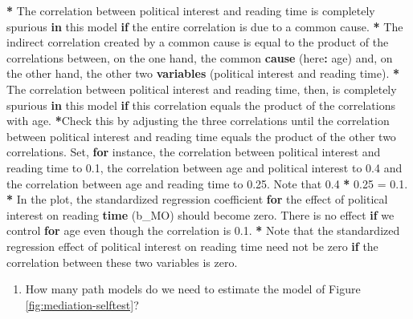 \documentclass[a4paper]{book}
\newenvironment{Shaded}{\begin{snugshade}}{\end{snugshade}}
\newcommand{\KeywordTok}[1]{\textcolor[rgb]{0,0,0}{\textbf{#1}}}
\newcommand{\FloatTok}[1]{\textcolor[rgb]{0.00,0.00,0.00}{#1}}
\newcommand{\StringTok}[1]{\textcolor[rgb]{0.00,0.00,0.00}{#1}}
\newcommand{\ControlFlowTok}[1]{\textcolor[rgb]{0.00,0.00,0.00}{\textbf{#1}}}
\newcommand{\OperatorTok}[1]{\textcolor[rgb]{0.00,0.00,0.00}{\textbf{#1}}}
\newcommand{\NormalTok}[1]{#1}
\providecommand{\tightlist}{%
  \setlength{\itemsep}{0pt}\setlength{\parskip}{0pt}}
\theoremstyle{definition}
\theoremstyle{definition}
\theoremstyle{definition}
\theoremstyle{remark}
\begin{document}
\begin{Shaded}
\begin{Highlighting}[]
\OperatorTok{*}\StringTok{ }\NormalTok{The correlation between political interest and reading time is completely}
\NormalTok{spurious }\ControlFlowTok{in}\NormalTok{ this model }\ControlFlowTok{if}\NormalTok{ the entire correlation is due to a common cause.}
\OperatorTok{*}\StringTok{ }\NormalTok{The indirect correlation created by a common cause is equal to the product}
\NormalTok{of the correlations between, on the one hand, the common }\KeywordTok{cause}\NormalTok{ (here}\OperatorTok{:}\StringTok{ }\NormalTok{age)}
\NormalTok{and, on the other hand, the other two }\KeywordTok{variables}\NormalTok{ (political interest and}
\NormalTok{reading time).}
\OperatorTok{*}\StringTok{ }\NormalTok{The correlation between political interest and reading time, then, is}
\NormalTok{completely spurious }\ControlFlowTok{in}\NormalTok{ this model }\ControlFlowTok{if}\NormalTok{ this correlation equals the product of}
\NormalTok{the correlations with age.}
\OperatorTok{*}\NormalTok{Check this by adjusting the three correlations until the correlation between}
\NormalTok{political interest and reading time equals the product of the other two}
\NormalTok{correlations. Set, }\ControlFlowTok{for}\NormalTok{ instance, the correlation between political interest and}
\NormalTok{reading time to }\FloatTok{0.1}\NormalTok{, the correlation between age and political interest to }\FloatTok{0.4}
\NormalTok{and the correlation between age and reading time to }\FloatTok{0.25}\NormalTok{. Note that }\FloatTok{0.4} \OperatorTok{*}\StringTok{ }\FloatTok{0.25}
\NormalTok{=}\StringTok{ }\FloatTok{0.1}\NormalTok{.}
\OperatorTok{*}\StringTok{ }\NormalTok{In the plot, the standardized regression coefficient }\ControlFlowTok{for}\NormalTok{ the effect of}
\NormalTok{political interest on reading }\KeywordTok{time}\NormalTok{ (b_MO) should become zero. There is no}
\NormalTok{effect }\ControlFlowTok{if}\NormalTok{ we control }\ControlFlowTok{for}\NormalTok{ age even though the correlation is }\FloatTok{0.1}\NormalTok{.}
\OperatorTok{*}\StringTok{ }\NormalTok{Note that the standardized regression effect of political interest on}
\NormalTok{reading time need not be zero }\ControlFlowTok{if}\NormalTok{ the correlation between these two variables}
\NormalTok{is zero.}
\end{Highlighting}
\end{Shaded}

\begin{enumerate}
\def\labelenumi{\arabic{enumi}.}
\setcounter{enumi}{3}
\tightlist
\item
  How many path models do we need to estimate the model of Figure
  \ref{fig:mediation-selftest}?
\end{enumerate}
\end{document}
